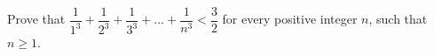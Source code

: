 Prove that $\dfrac{1}{1^3} + \dfrac{1}{2^3} + \dfrac{1}{3^3} + ... + \dfrac{1}{n^3} < \dfrac{3}{2}$ for every positive integer $n$, such that $n \ge 1$.
